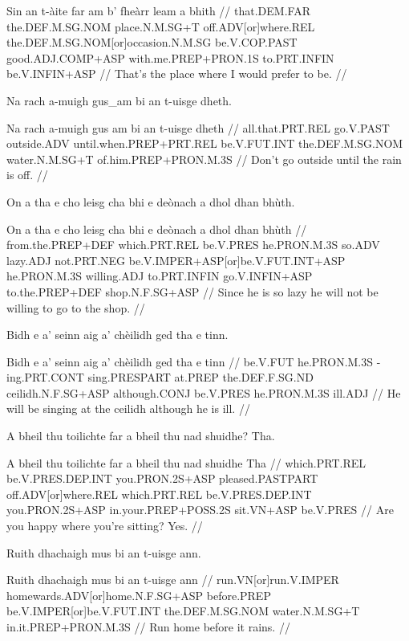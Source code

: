 \documentclass[a4paper,10pt]{article}
\begin{document}
\vspace{4mm}
\gla Sin an t-àite far am b' fheàrr leam a bhith  //
\glb that.DEM.FAR the.DEF.M.SG.NOM place.N.M.SG+T off.ADV[or]where.REL the.DEF.M.SG.NOM[or]occasion.N.M.SG be.V.COP.PAST good.ADJ.COMP+ASP with.me.PREP+PRON.1S to.PRT.INFIN be.V.INFIN+ASP  //
\glft That's the place where I would prefer to be. //
\endgl
\xe

\ex
\begingl
\glpre Na rach a-muigh gus\_am bi an t-uisge dheth. 

\vspace{4mm}
\gla Na rach a-muigh {gus am} bi an t-uisge dheth  //
\glb all.that.PRT.REL go.V.PAST outside.ADV until.when.PREP+PRT.REL be.V.FUT.INT the.DEF.M.SG.NOM water.N.M.SG+T of.him.PREP+PRON.M.3S  //
\glft Don't go outside until the rain is off. //
\endgl
\xe

\ex
\begingl
\glpre On a tha e cho leisg cha bhi e deònach a dhol dhan bhùth. 

\vspace{4mm}
\gla On a tha e cho leisg cha bhi e deònach a dhol dhan bhùth  //
\glb from.the.PREP+DEF which.PRT.REL be.V.PRES he.PRON.M.3S so.ADV lazy.ADJ not.PRT.NEG be.V.IMPER+ASP[or]be.V.FUT.INT+ASP he.PRON.M.3S willing.ADJ to.PRT.INFIN go.V.INFIN+ASP to.the.PREP+DEF shop.N.F.SG+ASP  //
\glft Since he is so lazy he will not be willing to go to the shop. //
\endgl
\xe

\ex
\begingl
\glpre Bidh e a' seinn aig a' chèilidh ged tha e tinn. 

\vspace{4mm}
\gla Bidh e a' seinn aig a' chèilidh ged tha e tinn  //
\glb be.V.FUT he.PRON.M.3S -ing.PRT.CONT sing.PRESPART at.PREP the.DEF.F.SG.ND ceilidh.N.F.SG+ASP although.CONJ be.V.PRES he.PRON.M.3S ill.ADJ  //
\glft He will be singing at the ceilidh although he is ill. //
\endgl
\xe

\ex
\begingl
\glpre A bheil thu toilichte far a bheil thu nad shuidhe? Tha. 

\vspace{4mm}
\gla A bheil thu toilichte far a bheil thu nad shuidhe Tha  //
\glb which.PRT.REL be.V.PRES.DEP.INT you.PRON.2S+ASP pleased.PASTPART off.ADV[or]where.REL which.PRT.REL be.V.PRES.DEP.INT you.PRON.2S+ASP in.your.PREP+POSS.2S sit.VN+ASP be.V.PRES  //
\glft Are you happy where you're sitting? Yes. //
\endgl
\xe

\ex
\begingl
\glpre Ruith dhachaigh mus bi an t-uisge ann. 

\vspace{4mm}
\gla Ruith dhachaigh mus bi an t-uisge ann  //
\glb run.VN[or]run.V.IMPER homewards.ADV[or]home.N.F.SG+ASP before.PREP be.V.IMPER[or]be.V.FUT.INT the.DEF.M.SG.NOM water.N.M.SG+T in.it.PREP+PRON.M.3S  //
\glft Run home before it rains. //
\endgl
\xe
\end{document}

